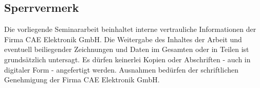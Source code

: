 \subsection*{Sperrvermerk}

	Die vorliegende Seminararbeit beinhaltet interne vertrauliche Informationen
	der Firma CAE Elektronik GmbH. Die Weitergabe des Inhaltes der Arbeit
	und eventuell beiliegender Zeichnungen und Daten im Gesamten oder
	in Teilen ist grundsätzlich untersagt. Es dürfen keinerlei Kopien
	oder Abschriften - auch in digitaler Form - angefertigt werden. Ausnahmen
	bedürfen der schriftlichen Genehmigung der Firma CAE Elektronik GmbH.